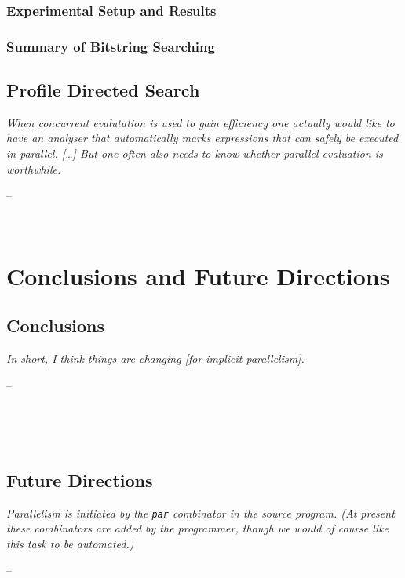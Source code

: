 \documentclass[openright, dottedtoc, headinclude, footinclude=true, a4paper, numbers=noenddot]{scrreprt}
\makeatletter
\newenvironment{chapquote}[2][2em]
  {\setlength{\@tempdima}{#1}%
   \def\chapquote@author{#2}%
   \parshape 1 \@tempdima \dimexpr\textwidth-2\@tempdima\relax%
   \itshape}
  {\par\normalfont\hfill--\ \chapquote@author\hspace*{\@tempdima}\par\noindent\hrulefill\\[1cm]}
\makeatother
\begin{document}
        \section{Experimental Setup and Results}
        \label{sec:blind-Results}
        
    
        \section{Summary of Bitstring Searching}
        \label{sec:blind-Conclusion}
        
    
    \chapter{Profile Directed Search}
    \label{chap:prof-search}
    \begin{chapquote}{\cite{dutchBook}}
    When concurrent evalutation is used to gain efficiency one actually would
    like to have an analyser that \emph{automatically} marks expressions that
    can safely be executed in parallel. [\dots] But one often also needs to know whether parallel evaluation
    is \emph{worthwhile}.
    \end{chapquote}
    
    
        \label{sec:informed-search}
        


\part{Conclusions and Future Directions}
\label{part:conclusion}

    \chapter{Conclusions}
    \label{chap:conclusions}
    \begin{chapquote}{\cite{spjQuote2005}}
     In short, I think things are changing \emph{[for implicit parallelism]}.
    \end{chapquote}
    
    \\[1cm]
    
    
    \chapter{Future Directions}
    \label{chap:future}
    \begin{chapquote}{\cite{trinder1996gum}}
    Parallelism is initiated by the \verb'par' combinator in the source
    program. (At present these combinators are added by the programmer, though
    we would of course like this task to be automated.)
    \end{chapquote}
    
    
\end{document}

